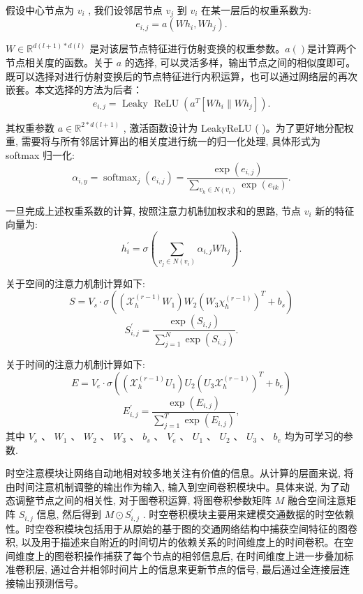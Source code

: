 假设中心节点为 \({{v}}_{{i}}\) , 我们设邻居节点 \({{v}}_{{j}}\) 到 \({{v}}_{{i}}\) 在某一层后的权重系数为:
\[
{e}_{i, j} = a\left( {W{h}_{i}, W{h}_{j}}\right).
\]

\({W} \in  \mathbb{R}^{d\left( {l + 1}\right)  * d\left( l\right) }\) 是对该层节点特征进行仿射变换的权重参数。$a()$是计算两个节点相关度的函数。关于 \({a}\) 的选择, 可以灵活多样，输出节点之间的相似度即可。既可以选择对进行仿射变换后的节点特征进行内积运算，也可以通过网络层的再次嵌套。本文选择的方法为后者：
\[
{{e}}_{{i}, {j}} = \text{ Leaky }\operatorname{ReLU}\left( {{{a}}^{{T}}\left\lbrack  {{{{Wh}}}_{{i}}\parallel {{{Wh}}}_{{j}}}\right\rbrack  }\right).
\]

其权重参数 \({a} \in  {\mathbb{R}}^{2 * {d}\left( {{l} + 1}\right) }\) , 激活函数设计为 LeakyReLU (   )。为了更好地分配权重, 需要将与所有邻居计算出的相关度进行统一的归一化处理, 具体形式为 softmax 归一化:
\[
{\alpha }_{i, y} = {\operatorname{softmax}}_{j}\left( {e}_{i, j}\right)  = \frac{\exp \left( {e}_{i, j}\right) }{\mathop{\sum }\limits_{{{v}_{k} \in  N\left( {v}_{i}\right) }}\exp \left( {e}_{ik}\right) }.
\]

一旦完成上述权重系数的计算, 按照注意力机制加权求和的思路, 节点 \({{v}}_{{i}}\) 新的特征向量为:
\[
{h}_{i}^{\prime } = \sigma \left( {\mathop{\sum }\limits_{{{v}_{j} \in  N\left( {v}_{i}\right) }}{\alpha }_{i, j}W{h}_{j}}\right).
\]

关于空间的注意力机制计算如下:
\[
S = {V}_{s} \cdot  \sigma \left( {\left( {{\mathcal{X}}_{h}^{\left( r - 1\right) }{W}_{1}}\right) {W}_{2}{\left( {W}_{3}{\chi }_{h}^{\left( r - 1\right) }\right) }^{T} + {b}_{s}}\right)
\]
\[
{S}_{i, j}^{\prime } = \frac{\exp \left( {S}_{i, j}\right) }{\mathop{\sum }\limits_{{j = 1}}^{N}\exp \left( {S}_{i, j}\right) }.
\]

关于时间的注意力机制计算如下:
\[
{E} = {{V}}_{{e}} \cdot  \sigma \left( {\left( {{\mathcal{X}}_{{h}}^{\left( {r} - 1\right) }{{U}}_{1}}\right) {{U}}_{2}{\left( {{U}}_{3}{\mathcal{X}}_{{h}}^{\left( {r} - 1\right) }\right) }^{{T}} + {{b}}_{{e}}}\right)
\]
\[
{E}_{i, j}^{\prime } = \frac{\exp \left( {E}_{i, j}\right) }{\mathop{\sum }\limits_{{j = 1}}^{T}\exp \left( {E}_{i, j}\right) }, 
\]
其中 \({{V}}_{{s}}\) 、 \({{W}}_{1}\) 、 \({{W}}_{2}\) 、 \({{W}}_{3}\) 、 \({{b}}_{{s}}\) 、 \({{V}}_{{e}}\) 、 \({{U}}_{1}\) 、 \({{U}}_{2}\) 、 \({{U}}_{3}\) 、 \({{b}}_{{e}}\) 均为可学习的参数.

时空注意模块让网络自动地相对较多地关注有价值的信息。从计算的层面来说, 将由时间注意机制调整的输出作为输入, 输入到空间卷积模块中。具体来说, 为了动态调整节点之间的相关性, 对于图卷积运算, 将图卷积参数矩阵 \({M}\) 融合空间注意矩阵 \({S}_{i, j}\) 信息, 然后得到 \({M} \odot  {S}_{i, j}^{\prime }\) . 时空卷积模块主要用来建模交通数据的时空依赖性。时空卷积模块包括用于从原始的基于图的交通网络结构中捕获空间特征的图卷积, 以及用于描述来自附近的时间切片的依赖关系的时间维度上的时间卷积。在空间维度上的图卷积操作捕获了每个节点的相邻信息后, 在时间维度上进一步叠加标准卷积层, 通过合并相邻时间片上的信息来更新节点的信号, 最后通过全连接层连接输出预测信号。


